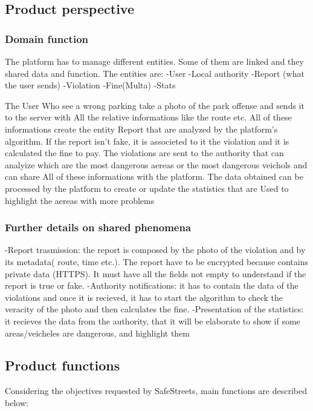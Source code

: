 \subsection{Product perspective}

\subsubsection{Domain function}

The platform has to manage different entities. Some of them are linked and they shared data and function.
The entities are: 
-User
-Local authority 
-Report (what the user sends)
-Violation 
-Fine(Multa)
-Stats

The User Who see a wrong parking take a photo of the park offense and sends it to the server with All the relative informations like the route etc.
All of these informations create the entity Report that are analyzed by the platform’s algorithm.
If the report isn’t fake, it is associeted to it the violation and it is calculated the fine to pay.
The violations are sent to the authority that can analyize which are the most dangerous aereas or the most dangerous veichols and can share All of these informations with the platform.
The data obtained can be processed by the platform to create or update the statistics that are Used to highlight the aereas with more problems 

\subsubsection{Further details on shared phenomena}

-Report trasmission: the report is composed by the photo of the violation and by its metadata( route, time etc.).
The report have to be encrypted because contains private data (HTTPS).
It must have all the fields not empty to understand if the report is true or fake.
-Authority notifications: it has to contain the data of the violations and once it is recieved, it has to start the algorithm to check the veracity of the photo and then calculates the fine.
-Presentation of the statistics: it recieves the data from the authority, that it will be elaborate to show if some areas/veicheles are dangerous, and highlight them

\subsection{Product functions}
Considering the objectives requested by SafeStreets, main functions are described below:

